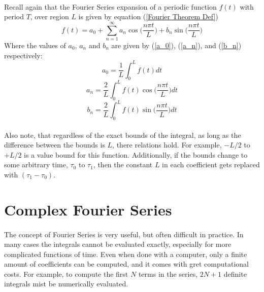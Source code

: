 \documentclass[12pt,letterpaper]{article}
\begin{document}
\paragraph*{}Recall again that the Fourier Series expansion of a periodic function $f(t)$ with period $T$, over region $L$ is given by equation (\ref{Fourier Theorem Def})
\begin{equation}
f(t) = a_0 + \sum_{n=1}^{\infty} a_n \cos\Big(\frac{n\pi t}{L}\Big) + b_n \sin\Big(\frac{n\pi t}{L}\Big)
\end{equation} 
Where the values of $a_0$, $a_n$ and $b_n$ are given by (\ref{a_0}), (\ref{a_n}), and (\ref{b_n}) respectively:
\begin{equation}
a_0 = \frac{1}{L}\int_0^L f(t) dt
\end{equation}
\begin{equation}
a_n = \frac{2}{L}\int_0^L f(t)\cos\Big(\frac{n\pi t}{L}\Big) dt
\end{equation}
\begin{equation}
b_n = \frac{2}{L}\int_0^L f(t)\sin\Big(\frac{n\pi t}{L}\Big) dt
\end{equation}
\paragraph*{}Also note, that regardless of the exact bounds of the integral, as long as the difference between the bounds is $L$, there relations hold. For example, $-L/2$ to $+L/2$ is a value bound for this function. Additionally, if the bounds change to some arbitrary time, $\tau_0$ to $\tau_1$, then the constant $L$ in each coefficient gets replaced with $(\tau_1 - \tau_0)$.
 

\section{Complex Fourier Series}
\paragraph*{}The concept of Fourier Series is very useful, but often difficult in practice. In many cases the integrals cannot be evaluated exactly, especially for more complicated functions of time. Even when done with a computer, only a finite amount of coefficients can be computed, and it comes with gret computational costs. For example, to compute the first $N$ terms in the series, $2N + 1$ definite integrals mist be numerically evaluated.
\end{document}
